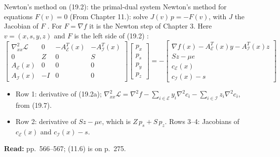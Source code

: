 \documentclass[aspectratio=169,12pt]{beamer}
\newcommand{\gradf}{\nabla f}
\newcommand{\eqn}[1]{\text{\small(#1)}}
\newcommand{\readbook}[1]{{\color{red}\textbf{Read:} #1}}
\newcommand{\cE}{\mathcal{E}}
\newcommand{\cI}{\mathcal{I}}
\newcommand{\cL}{\mathcal{L}}
\newcommand{\hessL}{\nabla_{xx}^{2}\cL}
\newcommand{\Ae}{A_{\cE}}
\newcommand{\Ai}{A_{\cI}}
\newcommand{\rd}{\nabla f(x)-\Ae^{T}(x)y-\Ai^{T}(x)z}
\newcommand{\from}[1]{{\small(From #1.)}}
\begin{document}
\begin{frame}{Newton's method on (19.2): the primal-dual system}
  Newton's method for equations $F(v)=0$ \from{Chapter 11}: solve $J(v)\,p=-F(v)$, with $J$ the Jacobian of $F$
  \eqn{11.6}. For $F=\gradf$ it is the Newton step of Chapter 3.
  Here $v=(x,s,y,z)$ and $F$ is the left side of (19.2) \eqn{19.6}:
  \[ \begin{bmatrix}
       \hessL & 0 & -\Ae^{T}(x) & -\Ai^{T}(x)\\
       0 & Z & 0 & S\\
       \Ae(x) & 0 & 0 & 0\\
       \Ai(x) & -I & 0 & 0
     \end{bmatrix}
     \begin{bmatrix} p_{x}\\ p_{s}\\ p_{y}\\ p_{z}\end{bmatrix}
     =-\begin{bmatrix} \rd\\ Sz-\mu e\\ c_{\cE}(x)\\ c_{\cI}(x)-s\end{bmatrix} \]
  \begin{itemize}\setlength\itemsep{0.25em}
    \item Row 1: derivative of (19.2a);
      $\hessL=\nabla^{2}f-\sum_{i\in\cE}y_{i}\nabla^{2}c_{i}-\sum_{i\in\cI}z_{i}\nabla^{2}c_{i}$, from (19.7).
    \item Row 2: derivative of $Sz-\mu e$, which is $Z\,p_{s}+S\,p_{z}$.
      Rows 3--4: Jacobians of $c_{\cE}(x)$ and $c_{\cI}(x)-s$.
  \end{itemize}
  \readbook{pp.~566--567; (11.6) is on p.~275.}
\end{frame}
\end{document}
